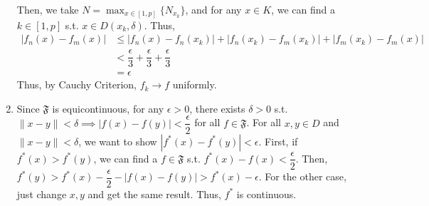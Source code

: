 \documentclass[12pt]{article}
\begin{document}
\begin{enumerate}
    Then, we take $N = \displaystyle\max_{x\in [1, p]}\{ N_{x_k}\}$, and for any $x\in K$, we can find a $k\in [1, p]$ s.t. $x \in D(x_k, \delta)$.
    Thus, \begin{align*}
        |f_n(x) - f_m(x)| &\leq |f_n(x) - f_n(x_k)| + |f_n(x_k) - f_m(x_k)| + |f_m(x_k) - f_m(x)|\\
        &< \dfrac{\epsilon}{3} + \dfrac{\epsilon}{3} + \dfrac{\epsilon}{3}\\
        &= \epsilon
    \end{align*}
    Thus, by Cauchy Criterion, $f_k \to f$ uniformly.

    \item Since $\mathfrak{F}$ is equicontinuous, for any $\epsilon > 0$, there exists $\delta > 0$ s.t. $\| x-y\| < \delta \implies |f(x) - f(y)| < \dfrac{\epsilon}{2}$ for all $f\in \mathfrak{F}$.
    For all $x, y\in D$ and $\|x - y\| < \delta$, we want to show $|f^*(x) - f^*(y)| < \epsilon$.
    First, if $f^*(x) > f^*(y)$, we can find a $f\in \mathfrak{F}$ s.t. $f^*(x) - f(x) < \dfrac{\epsilon}{2}$.
    Then, $f^*(y) > f^*(x) - \dfrac{\epsilon}{2} - |f(x) - f(y)| > f^*(x) - \epsilon$.
    For the other case, just change $x, y$ and get the same result.
    Thus, $f^*$ is continuous.
\end{enumerate}
\end{document}
